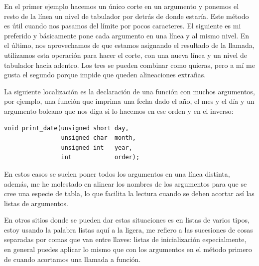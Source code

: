 \documentclass[a4paper]{article}
\begin{document}
En el primer ejemplo hacemos un único corte en un argumento y ponemos
el resto de la línea un nivel de tabulador por detrás de donde estaría.
Este método es útil cuando nos pasamos del límite por pocos caracteres.
El siguiente es mi preferido y básicamente pone cada argumento en una línea
y al mismo nivel. En el último, nos aprovechamos de que estamos asignando el
resultado de la llamada, utilizamos esta operación para hacer el corte,
con una nueva línea y un nivel de tabulador hacia adentro. Los tres se pueden
combinar como quieras, pero a mí me gusta el segundo porque impide que
queden alineaciones extrañas.

La siguiente localización es la declaración de una función con muchos
argumentos, por ejemplo, una función que imprima una fecha dado el año, el
mes y el día y un argumento boleano que nos diga si lo hacemos en ese orden
y en el inverso:

\noindent
\begin{minipage}[H]{\linewidth}
\mbox{}
\begin{lstlisting}[style=C,
caption={Acortamiento de una declaración de función},
label={lst:functionShorting}]
void print_date(unsigned short day,
                unsigned char  month,
                unsigned int   year,
                int            order);
\end{lstlisting}
\end{minipage}

En estos casos se suelen poner todos los argumentos en una línea distinta,
además, me he molestado en alinear los nombres de los argumentos para
que se cree una especie de tabla, lo que facilita la lectura cuando se deben
acortar así las listas de argumentos.

En otros sitios donde se pueden dar estas situaciones es en listas de varios
tipos, estoy usando la palabra listas aquí a la ligera, me refiero a
las sucesiones de cosas separadas por comas que van entre llaves:
listas de inicialización especialmente, en general puedes aplicar lo mismo que
con los argumentos en el método primero de cuando acortamos una llamada a
función.
\end{document}
